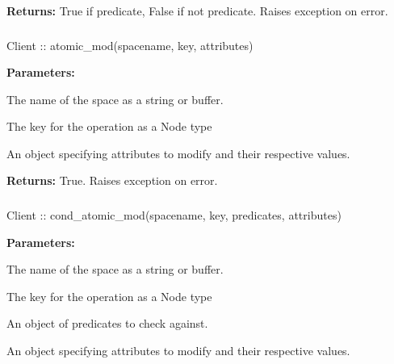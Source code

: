 \noindent\textbf{Returns:}
True if predicate, False if not predicate.  Raises exception on error.

\subsubsection{}
\label{api:nodejs:atomic_mod}
\begin{javascriptcode}
Client :: atomic_mod(spacename, key, attributes)
\end{javascriptcode}
\funcdesc 

\noindent\textbf{Parameters:}
\begin{description}[labelindent=\widthof{{\code{attributes}}},leftmargin=*,noitemsep,nolistsep,align=right]
\item[\code{spacename}] The name of the space as a string or buffer.
\item[\code{key}] The key for the operation as a Node type
\item[\code{attributes}] An object specifying attributes to modify and their respective values.
\end{description}

\noindent\textbf{Returns:}
True.  Raises exception on error.

\subsubsection{}
\label{api:nodejs:cond_atomic_mod}
\begin{javascriptcode}
Client :: cond_atomic_mod(spacename, key, predicates, attributes)
\end{javascriptcode}
\funcdesc 

\noindent\textbf{Parameters:}
\begin{description}[labelindent=\widthof{{\code{predicates}}},leftmargin=*,noitemsep,nolistsep,align=right]
\item[\code{spacename}] The name of the space as a string or buffer.
\item[\code{key}] The key for the operation as a Node type
\item[\code{predicates}] An object of predicates to check against.
\item[\code{attributes}] An object specifying attributes to modify and their respective values.
\end{description}

